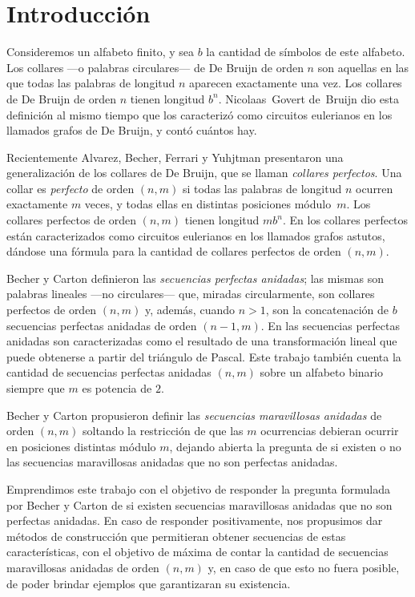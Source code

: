 \chapter{Introducción}

Consideremos un alfabeto finito, y sea $b$ la
cantidad de símbolos de este alfabeto.
Los collares ---o palabras circulares--- de
De Bruijn de orden $n$ son aquellas en las que todas las palabras de longitud
$n$ aparecen exactamente una vez.
Los collares de De Bruijn de orden $n$ tienen longitud $b^n$.
Nicolaas~Govert de~Bruijn \cite{de-bruijn-combinatorial-problem}
dio esta definición al mismo tiempo que los caracterizó como circuitos eulerianos
en los llamados grafos de De Bruijn, y contó cuántos hay.

Recientemente Alvarez, Becher, Ferrari y Yuhjtman \cite{alvarez-perfect-necklaces}
presentaron una generalización de los collares de De Bruijn,
que se llaman \emph{collares perfectos}.
Una collar es \emph{perfecto} de orden $(n,m)$ si todas las palabras 
de longitud $n$ ocurren exactamente $m$ veces, y todas ellas en distintas
posiciones módulo~$m$.
Los collares perfectos de orden $(n,m)$ tienen longitud $mb^n$.
En \cite{alvarez-perfect-necklaces} los collares perfectos están
caracterizados como circuitos eulerianos en los llamados grafos astutos,
dándose una fórmula para la cantidad de collares perfectos de orden $(n,m)$.

Becher y Carton \cite{becher-nested-perfect} definieron las
\emph{secuencias perfectas anidadas}; las mismas son palabras lineales ---no
circulares--- que, miradas circularmente, son collares perfectos de orden $(n,m)$
y, además, cuando $n>1$, son la concatenación de $b$ secuencias perfectas
anidadas de orden $(n-1, m)$.
En \cite{becher-nested-perfect} las secuencias perfectas anidadas son
caracterizadas como el resultado de una transformación lineal que puede
obtenerse a partir del triángulo de Pascal. Este trabajo también cuenta la
cantidad de secuencias perfectas anidadas $(n,m)$ sobre un alfabeto binario
siempre que $m$ es potencia de $2$.

Becher y Carton propusieron definir las \emph{secuencias maravillosas anidadas}
de orden $(n,m)$ soltando la restricción de que las $m$ ocurrencias debieran
ocurrir en posiciones distintas módulo $m$, dejando abierta la pregunta de si
existen o no las secuencias maravillosas anidadas que no son perfectas anidadas.

\medskip

Emprendimos este trabajo con el objetivo de responder la pregunta formulada por
Becher y Carton de si existen secuencias maravillosas anidadas que no son
perfectas anidadas.
En caso de responder positivamente, nos propusimos dar métodos de construcción
que permitieran obtener secuencias de estas características, con el objetivo
de máxima de contar la cantidad de secuencias maravillosas anidadas de orden
$(n,m)$ y, en caso de que esto no fuera posible, de poder brindar ejemplos que
garantizaran su existencia.

